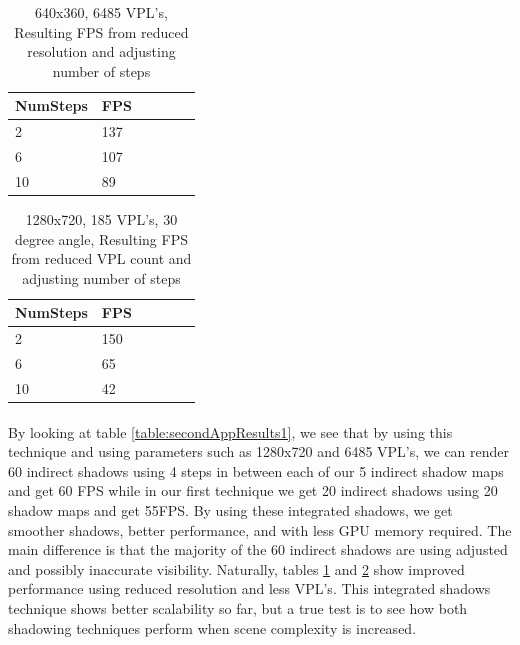 \begin{table}[h!]
	\caption{640x360, 6485 VPL's, Resulting FPS from reduced resolution and adjusting number of steps}
	\begin{center}
	    \begin{tabular}{ | l | l | l | l | l | l |}
	    \hline
	    NumSteps & FPS\\ \hline
	    2 & 137\\ \hline
	    6 & 107\\ \hline
	    10 & 89\\ \hline
	    \end{tabular}
	\end{center}
	\label{table:secondAppResults2}
\end{table}

\begin{table}[h!]
	\caption{1280x720, 185 VPL's, 30 degree angle, Resulting FPS from reduced VPL count and adjusting number of steps}
	\begin{center}
	    \begin{tabular}{ | l | l | l | l | l | l |}
	    \hline
	    NumSteps & FPS\\ \hline
	    2 & 150\\ \hline
	    6 & 65\\ \hline
	    10 & 42\\ \hline
	    \end{tabular}
	\end{center}
	\label{table:secondAppResults3}
\end{table}

\paragraph{}
By looking at table \ref{table:secondAppResults1}, we see that by using this technique and using parameters such as 1280x720 and 6485 VPL's, we can render 60 indirect shadows using 4 steps in between each of our 5 indirect shadow maps and get 60 FPS while in our first technique we get 20 indirect shadows using 20 shadow maps and get 55FPS.  By using these integrated shadows, we get smoother shadows, better performance, and with less GPU memory required.  The main difference is that the majority of the 60 indirect shadows are using adjusted and possibly inaccurate visibility.  Naturally, tables \ref{table:secondAppResults2} and \ref{table:secondAppResults3} show improved performance using reduced resolution and less VPL's.  This integrated shadows technique shows better scalability so far, but a true test is to see how both shadowing techniques perform when scene complexity is increased.

